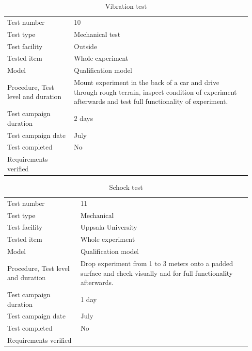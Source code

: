 \documentclass[
  a4paper,
  11pt,
  openany,
  parskip,
  toc=totoc,
  listof=totoc,
  bibliography=totoc
]{scrreprt}
\begin{document}
\begin{table}[H]
\centering
\caption{Vibration test}
\label{tab:test_vibration}
\begin{tabular}{L{5cm}L{10cm}}
\toprule
Test number & 10 \\
Test type & Mechanical test \\
Test facility & Outside \\
Tested item & Whole experiment \\
Model & Qualification model \\
Procedure, Test level and duration & Mount experiment in the back of a car and drive through rough terrain, inspect condition of experiment afterwards and test full functionality of experiment. \\
Test campaign duration & 2 days \\
Test campaign date & July \\
Test completed & No \\
Requirements verified & \\
\bottomrule
\end{tabular}
\end{table}


\begin{table}[H]
\centering
\caption{Schock test}
\label{tab:test_shock}
\begin{tabular}{L{5cm}L{10cm}}
\toprule
Test number & 11 \\
Test type & Mechanical \\
Test facility & Uppsala University \\
Tested item & Whole experiment \\
Model & Qualification model \\
Procedure, Test level and duration & Drop experiment from 1 to 3 meters onto a padded surface and check visually and for full functionality afterwards. \\
Test campaign duration & 1 day \\
Test campaign date & July \\
Test completed & No \\
Requirements verified & \\
\bottomrule
\end{tabular}
\end{table}
\end{document}
